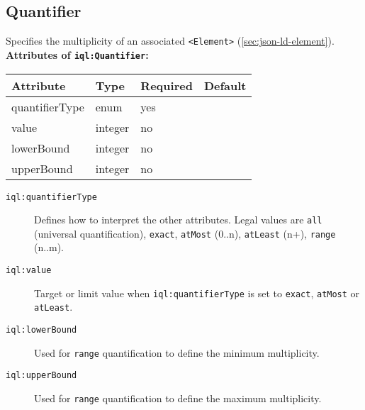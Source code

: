 \documentclass[11pt]{article}
\newcommand{\iqlns}{iql:}
\newcommand{\iqlType}[1]{\texttt{\iqlns#1}}
\newcommand{\iqlBaseType}[1]{\texttt{\textless#1\textgreater}}
\newcommand{\desc}[1]{\noindent#1\newline\medskip}
\newenvironment{attributes}[1]{
\noindent\textbf{Attributes of #1:}\newline\medskip
\begin{tabular}{|p{0.3\textwidth}|p{0.20\textwidth}|p{0.20\textwidth}|p{0.17\textwidth}|}
	\hline
	\textbf{Attribute} & \textbf{Type} & \textbf{Required} & \textbf{Default} \\ 
	\hline
	\hline
}{
\end{tabular}
}
\newcommand{\attribute}[4]{
	#1 & #2 & #3 & #4 \\
	\hline
}
\begin{document}
\subsection{Quantifier}
\label{sec:json-ld-quantifier}
\desc{Specifies the multiplicity of an associated \iqlBaseType{Element} (\ref{sec:json-ld-element}).}
\begin{attributes}{\iqlType{Quantifier}}
	\attribute{quantifierType}{enum}{yes}{}
	\attribute{value}{integer}{no}{}
	\attribute{lowerBound}{integer}{no}{}
	\attribute{upperBound}{integer}{no}{}
\end{attributes}
\begin{description}
	\item[\iqlType{quantifierType}] Defines how to interpret the other attributes. Legal values are \texttt{all} (universal quantification), \texttt{exact}, \texttt{atMost} (0..n), \texttt{atLeast} (n+), \texttt{range} (n..m).
	\item[\iqlType{value}] Target or limit value when \iqlType{quantifierType} is set to \texttt{exact}, \texttt{atMost} or \texttt{atLeast}.
	\item[\iqlType{lowerBound}] Used for \texttt{range} quantification to define the minimum multiplicity.
	\item[\iqlType{upperBound}] Used for \texttt{range} quantification to define the maximum multiplicity.
\end{description}

\end{document}
